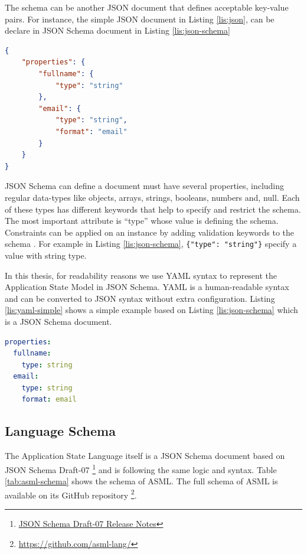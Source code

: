 The schema can be another JSON document that defines acceptable key-value pairs.
For instance, the simple JSON document in Listing \ref{lis:json}, can be declare in JSON Schema document in Listing \ref{lis:json-schema}

\lstset{
  label=lis:json-schema, caption=A simple JSON Schema document.
}
\begin{lstlisting}[language=json]
{
    "properties": {
        "fullname": {
            "type": "string"
        },
        "email": {
            "type": "string",
            "format": "email"
        }
    }
}
\end{lstlisting}

JSON Schema can define a document must have several properties, including regular data-types like objects, arrays, strings, booleans, numbers and, null. Each of these types has different keywords that help to specify and restrict the schema. The most important attribute is “type” whose value is defining the schema. Constraints can be applied on an instance by adding validation keywords to the schema \cite{json-model}. For example in Listing \ref{lis:json-schema}, \lstinline[basicstyle=\ttfamily]|{"type": "string"}| specify a value with string type.

In this thesis, for readability reasons we use YAML syntax to represent the Application State Model in JSON Schema. YAML is a human-readable syntax and can be converted to JSON syntax without extra configuration. Listing \ref{lis:yaml-simple} shows a simple example based on Listing \ref{lis:json-schema} which is a JSON Schema document.

\lstset{
  label=lis:yaml-simple, caption=Example of expressing JSON Schema in YAML syntax., 
}
\begin{lstlisting}[language=yaml]
properties:
  fullname:
    type: string
  email:
    type: string
    format: email
\end{lstlisting}

\subsection{Language Schema}
The Application State Language itself is a JSON Schema document based on JSON Schema Draft-07
\footnote{\href{https://json-schema.org/draft-07/json-schema-release-notes.html}{JSON Schema Draft-07 Release Notes}}
and is following the same logic and syntax. Table \ref{tab:asml-schema} shows the schema of ASML. 
The full schema of ASML is available on its GitHub repository
\footnote{\href{https://github.com/asml-lang/asml/blob/master/schemas/schema.json}{https://github.com/asml-lang/}}.

